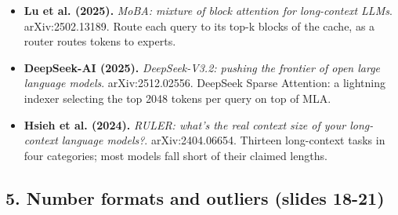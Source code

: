 \documentclass[11pt,letterpaper]{article}
\begin{document}
\begin{itemize}[leftmargin=1.2em,itemsep=3pt]
\item \textbf{Lu et al. (2025).} \textit{MoBA: mixture of block attention for long-context LLMs}. arXiv:2502.13189. Route each query to its top-k blocks of the cache, as a router routes tokens to experts.
\item \textbf{DeepSeek-AI (2025).} \textit{DeepSeek-V3.2: pushing the frontier of open large language models}. arXiv:2512.02556. DeepSeek Sparse Attention: a lightning indexer selecting the top 2048 tokens per query on top of MLA.
\item \textbf{Hsieh et al. (2024).} \textit{RULER: what's the real context size of your long-context language models?}. arXiv:2404.06654. Thirteen long-context tasks in four categories; most models fall short of their claimed lengths.
\end{itemize}
\subsection*{5. Number formats and outliers (slides 18-21)}
\end{document}
